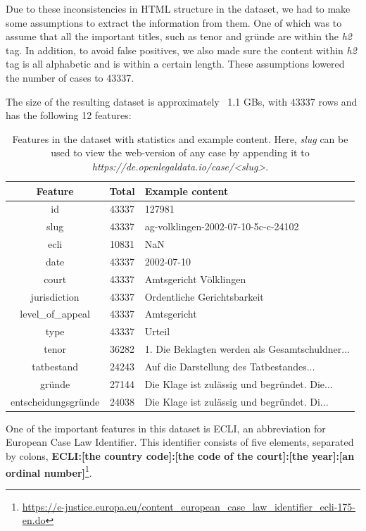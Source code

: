\documentclass[runningheads]{llncs}
\begin{document}
Due to these inconsistencies in HTML structure in the dataset, we had to make some assumptions to extract the information from them. One of which was to assume that all the important titles, such as tenor and gründe are within the \textit{h2} tag. In addition, to avoid false positives, we also made sure the content within \textit{h2} tag is all alphabetic and is within a certain length. These assumptions lowered the number of cases to 43337.

The size of the resulting dataset is approximately ~1.1 GBs, with 43337 rows and has the following 12 features:
\begin{table}[!h]
	\centering
	\begin{tabular}{|c|c|l|}
	    \hline
		\textbf{Feature} & \textbf{Total} & \textbf{Example content}\\
		\hline
		id & 43337 & 127981\\
		slug & 43337 & ag-volklingen-2002-07-10-5c-c-24102\\
		ecli & 10831 & NaN\\
		date & 43337 & 2002-07-10\\
		court & 43337 & Amtsgericht Völklingen\\
		jurisdiction & 43337 & Ordentliche Gerichtsbarkeit\\
		level\_of\_appeal & 43337 & Amtsgericht\\
		type & 43337 & Urteil\\
		tenor & 36282 & 1. Die Beklagten werden als Gesamtschuldner...\\
		tatbestand & 24243 & Auf die Darstellung des Tatbestandes...\\
		gründe & 27144 & Die Klage ist zulässig und begründet. Die...\\
		entscheidungsgründe & 24038 &  Die Klage ist zulässig und begründet. Di...\\
		\hline
	\end{tabular}
	\caption{Features in the dataset with statistics and example content. Here, \textit{slug} can be used to view the web-version of any case by appending it to \textit{https://de.openlegaldata.io/case/<slug>}.}
	\label{tab:data_example}
\end{table}

One of the important features in this dataset is ECLI, an abbreviation for European Case Law Identifier. This identifier consists of five elements, separated by colons, \textbf{ECLI:[the country code]:[the code of the court]:[the year]:[an ordinal number]}\footnote{\url{https://e-justice.europa.eu/content_european_case_law_identifier_ecli-175-en.do}}.
\end{document}

